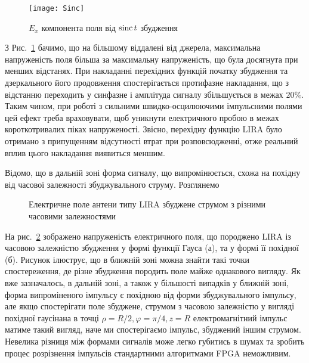 \begin{figure}[h] \begin{center}
\texttt{[image: Sinc]}
\caption{$ E_x $ компонента поля від $ \operatorname{sinc} t $ збудження}
\label{fig:ex_sinc}
\end{center} \end{figure}

З Рис.~\ref{fig:ex_sinc} бачимо, що на більшому віддалені від джерела, 
максимальна напруженість поля більша за максимальну напруженість, що була 
досягнута при менших відстанях. При накладанні перехідних функцій початку 
збудження та дзеркального його продовження спостерігається протифазне 
накладання, що з відстанню переходить у синфазне і амплітуда сигналу 
збільшується в межах $ 20\% $. Таким чином, при роботі з сильними 
швидко-осцилюючими імпульсними полями цей ефект треба враховувати, щоб 
уникнути електричного пробою в межах короткотривалих піках напруженості.
Звісно, перехідну функцію LIRA було отримано з припущенням відсутності 
втрат при розповсюдженні, отже реальний вплив цього накладання виявиться 
меншим.

Відомо, що в дальній зоні форма сигналу, що випромінюється, схожа на похідну
від часової залежності збуджувального струму. Розглянемо 

\begin{figure}
\caption{Електричне поле антени типу LIRA збуджене струмом з 
різними часовими залежностями}
\label{fig:gauss_shape}
\end{figure}

На рис.~\ref{fig:gauss_shape} зображено напруженість електричного поля, 
що породжено LIRA із часовою залежністю збудження у формі функції Гауса (а), 
та у формі її похідної (б). Рисунок ілюструє, що в ближній зоні можна знайти
такі точки спостереження, де різне збудження породить поле майже однакового 
вигляду. Як вже зазначалось, в дальній зоні, а також у більшості випадків у 
ближній зоні, форма випроміненого імпульсу є похідною від форми збуджувального 
імпульсу, але якщо спостерігати поле збуджене, струмом з часовою залежністю у 
вигляді похідної гаусінана в точці $ \rho = R/2, \varphi = \pi/4, z = R $
електромагнітний імпульс матиме такий вигляд, наче ми спостерігаємо імпульс, 
збуджений іншим струмом. Невелика різниця між формами сигналів може легко 
губитись в шумах та зробить процес розрізнення імпульсів стандартними 
алгоритмами FPGA неможливим.

